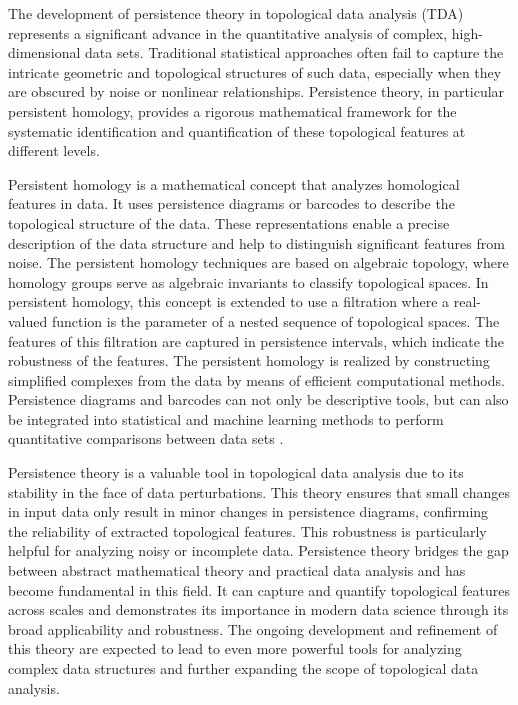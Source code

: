 The development of persistence theory in topological data analysis (TDA) represents a significant advance in the quantitative analysis of complex, high-dimensional data sets. Traditional statistical approaches often fail to capture the intricate geometric and topological structures of such data, especially when they are obscured by noise or nonlinear relationships. Persistence theory, in particular persistent homology, provides a rigorous mathematical framework for the systematic identification and quantification of these topological features at different levels.

Persistent homology is a mathematical concept that analyzes homological features in data. It uses persistence diagrams or barcodes to describe the topological structure of the data. These representations enable a precise description of the data structure and help to distinguish significant features from noise. The persistent homology techniques are based on algebraic topology, where homology groups serve as algebraic invariants to classify topological spaces. In persistent homology, this concept is extended to use a filtration where a real-valued function is the parameter of a nested sequence of topological spaces. The features of this filtration are captured in persistence intervals, which indicate the robustness of the features. The persistent homology is realized by constructing simplified complexes from the data by means of efficient computational methods. Persistence diagrams and barcodes can not only be descriptive tools, but can also be integrated into statistical and machine learning methods to perform quantitative comparisons between data sets \cite{melodia2018deep,melodia2020persistent,melodia2021estimate,melodia2021homological}.

Persistence theory is a valuable tool in topological data analysis due to its stability in the face of data perturbations. This theory ensures that small changes in input data only result in minor changes in persistence diagrams, confirming the reliability of extracted topological features. This robustness is particularly helpful for analyzing noisy or incomplete data. Persistence theory bridges the gap between abstract mathematical theory and practical data analysis and has become fundamental in this field. It can capture and quantify topological features across scales and demonstrates its importance in modern data science through its broad applicability and robustness. The ongoing development and refinement of this theory are expected to lead to even more powerful tools for analyzing complex data structures and further expanding the scope of topological data analysis.

